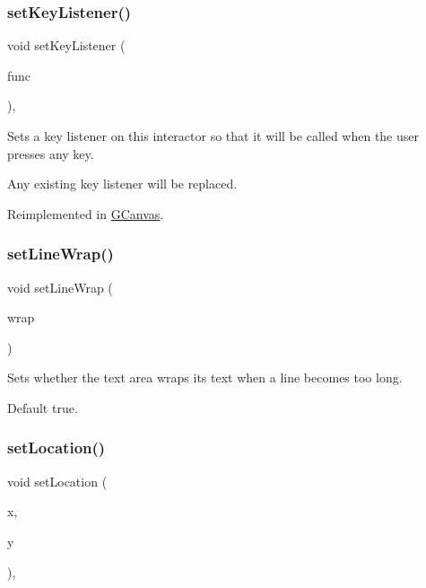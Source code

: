 \subsubsection{\texorpdfstring{set\+Key\+Listener()}{setKeyListener()}\hspace{0.1cm}{\footnotesize\ttfamily [2/2]}}
{\footnotesize\ttfamily void set\+Key\+Listener (\begin{DoxyParamCaption}\item[{\mbox{\hyperlink{namespacesgl_a54427ce97bb1c2804e4fe2b0a62e8b17}{G\+Event\+Listener\+Void}}}]{func }\end{DoxyParamCaption})\hspace{0.3cm}{\ttfamily [virtual]}, {\ttfamily [inherited]}}



Sets a key listener on this interactor so that it will be called when the user presses any key. 

Any existing key listener will be replaced. 

Reimplemented in \mbox{\hyperlink{classsgl_1_1GCanvas_a1320ed9889a730dfead04a334463ecf3}{G\+Canvas}}.

\mbox{\label{classsgl_1_1GTextArea_aaaafb06fec060b28b70ec3b7379657b4}} 
\subsubsection{\texorpdfstring{set\+Line\+Wrap()}{setLineWrap()}}
{\footnotesize\ttfamily void set\+Line\+Wrap (\begin{DoxyParamCaption}\item[{bool}]{wrap }\end{DoxyParamCaption})\hspace{0.3cm}{\ttfamily [virtual]}}



Sets whether the text area wraps its text when a line becomes too long. 

Default true. \mbox{\label{classsgl_1_1GInteractor_a04594e8ba9b98513a64f1da00dcae18c}} 
\subsubsection{\texorpdfstring{set\+Location()}{setLocation()}}
{\footnotesize\ttfamily void set\+Location (\begin{DoxyParamCaption}\item[{double}]{x,  }\item[{double}]{y }\end{DoxyParamCaption})\hspace{0.3cm}{\ttfamily [virtual]}, {\ttfamily [inherited]}}



